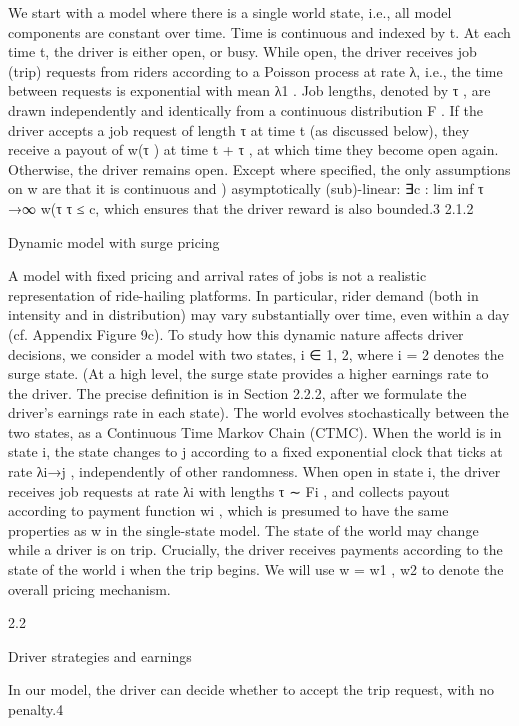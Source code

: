 \documentclass[10pt]{article}
\begin{document}
\begin{ReviewVerbatim}
We start with a model where there is a single world state, i.e., all model components are constant
over time. Time is continuous and indexed by t. At each time t, the driver is either open, or busy.
While open, the driver receives job (trip) requests from riders according to a Poisson process at
rate λ, i.e., the time between requests is exponential with mean λ1 . Job lengths, denoted by τ , are
drawn independently and identically from a continuous distribution F .
If the driver accepts a job request of length τ at time t (as discussed below), they receive
a payout of w(τ ) at time t + τ , at which time they become open again. Otherwise, the driver
remains open. Except where specified, the only assumptions on w are that it is continuous and
)
asymptotically (sub)-linear: ∃c : lim inf τ →∞ w(τ
τ ≤ c, which ensures that the driver reward is also
bounded.3
2.1.2

Dynamic model with surge pricing

A model with fixed pricing and arrival rates of jobs is not a realistic representation of ride-hailing
platforms. In particular, rider demand (both in intensity and in distribution) may vary substantially
over time, even within a day (cf. Appendix Figure 9c). To study how this dynamic nature affects
driver decisions, we consider a model with two states, i ∈ {1, 2}, where i = 2 denotes the surge
state. (At a high level, the surge state provides a higher earnings rate to the driver. The precise
definition is in Section 2.2.2, after we formulate the driver’s earnings rate in each state).
The world evolves stochastically between the two states, as a Continuous Time Markov Chain
(CTMC). When the world is in state i, the state changes to j according to a fixed exponential clock
that ticks at rate λi→j , independently of other randomness.
When open in state i, the driver receives job requests at rate λi with lengths τ ∼ Fi , and collects
payout according to payment function wi , which is presumed to have the same properties as w in
the single-state model. The state of the world may change while a driver is on trip. Crucially, the
driver receives payments according to the state of the world i when the trip begins. We will use
w = {w1 , w2 } to denote the overall pricing mechanism.

2.2

Driver strategies and earnings

In our model, the driver can decide whether to accept the trip request, with no penalty.4


\end{ReviewVerbatim}
\end{document}

